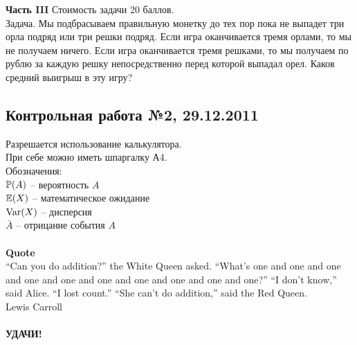 \documentclass[12pt, a4paper]{article}\usepackage[]{graphicx}\usepackage[]{color}
\begin{document}
\begin{enumerate}

\end{enumerate}

\textbf{Часть III} Стоимость задачи 20 баллов. \\

Задача. Мы подбрасываем правильную монетку до тех пор пока не выпадет три орла подряд или три решки подряд. Если игра оканчивается тремя орлами, то мы не получаем ничего. Если игра оканчивается тремя решками, то мы получаем по рублю за каждую решку непосредственно перед которой выпадал орел. Каков средний выигрыш в эту игру?




\subsection{Контрольная работа №2, 29.12.2011}

Разрешается использование калькулятора.\\

При себе можно иметь шпаргалку А4. \\

Обозначения: \\
$\P(A)$ -- вероятность $A$ \\
$\E(X)$ -- математическое ожидание \\
$\Var(X)$ -- дисперсия \\
$\bar{A}$ -- отрицание события $A$ \\ \\




\textbf{Quote}\\
“Can you do addition?” the White Queen asked. “What’s one and one and one and one and one and
one and one and one and one and one?”
“I don’t know,” said Alice. “I lost count.”
“She can’t do addition,” said the Red Queen. \\


Lewis Carroll \\ \\

\textbf{УДАЧИ!} \\
\end{document}
